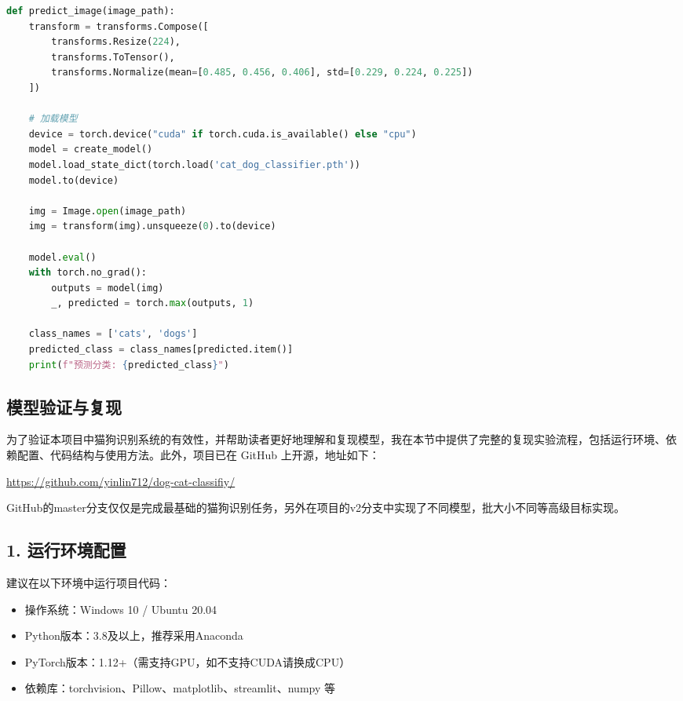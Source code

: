 \documentclass[10.5pt,compsoc]{CjC}
\theoremstyle{mystyle}
\begin{document}
\begin{CJK*}{GBK}{song}
\begin{lstlisting}[language=Python, caption={代码1\quad 图像分类预测函数}, label={code:predict}, frame=single, breaklines=true]
def predict_image(image_path):
    transform = transforms.Compose([
        transforms.Resize(224),
        transforms.ToTensor(),
        transforms.Normalize(mean=[0.485, 0.456, 0.406], std=[0.229, 0.224, 0.225])
    ])

    # 加载模型
    device = torch.device("cuda" if torch.cuda.is_available() else "cpu")
    model = create_model()
    model.load_state_dict(torch.load('cat_dog_classifier.pth'))
    model.to(device)

    img = Image.open(image_path)
    img = transform(img).unsqueeze(0).to(device)

    model.eval()
    with torch.no_grad():
        outputs = model(img)
        _, predicted = torch.max(outputs, 1)

    class_names = ['cats', 'dogs']
    predicted_class = class_names[predicted.item()]
    print(f"预测分类: {predicted_class}")
\end{lstlisting}

{\begin{CJK*}{GBK}{hei}\section{模型验证与复现}\end{CJK*}}

为了验证本项目中猫狗识别系统的有效性，并帮助读者更好地理解和复现模型，我在本节中提供了完整的复现实验流程，包括运行环境、依赖配置、代码结构与使用方法。此外，项目已在 GitHub 上开源，地址如下：

\begin{center}
\url{https://github.com/yinlin712/dog-cat-classifiy/}
\end{center}

GitHub的master分支仅仅是完成最基础的猫狗识别任务，另外在项目的v2分支中实现了不同模型，批大小不同等高级目标实现。

\subsection*{1. 运行环境配置}

建议在以下环境中运行项目代码：

\begin{itemize}
  \item 操作系统：Windows 10 / Ubuntu 20.04
  \item Python版本：3.8及以上，推荐采用Anaconda
  \item PyTorch版本：1.12+（需支持GPU，如不支持CUDA请换成CPU）
  \item 依赖库：torchvision、Pillow、matplotlib、streamlit、numpy 等
\end{itemize}


\end{CJK*}
\end{document}
